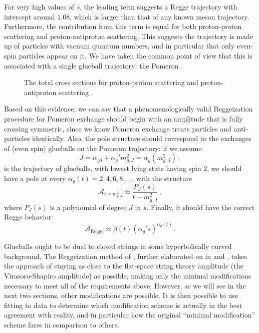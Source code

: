 \documentclass[aps, prd, preprintnumbers, floatfix, showpacs, showkeys, nofootinbib, 10pt]{revtex4-1}
\def\beq{\begin{equation}}
\def\eeq{\end{equation}}
\begin{document}
For very high values of $s$, the leading term suggests a Regge trajectory with intercept around $1.08$, which is larger than that of any known meson trajectory.  Furthermore, the contribution from this term is equal for both proton-proton scattering and proton-antiproton scattering.  This suggests the trajectory is made up of particles with vacuum quantum numbers, and in particular that only even-spin particles appear on it.  We have taken the common point of view that this is associated with a single glueball trajectory: the Pomeron \cite{CGM}.

\begin{figure}
\begin{center}
\caption{\label{totalcross} The total cross sections for proton-proton scattering and proton-antiproton scattering \cite{PDG}.}
\end{center}
\end{figure}

Based on this evidence, we can say that a phenomenologically valid Reggeization procedure for Pomeron exchange should begin with an amplitude that is fully crossing symmetric, since we know Pomeron exchange treats particles and anti-particles identically.  Also, the pole structure should correspond to the exchanges of (even spin) glueballs on the Pomeron trajectory: if we assume
\beq
J = \alpha_{g0} + \alpha_{g}'m_{g, J}^2 = \alpha_g(m_{g, J}^2) \, ,
\eeq
is the trajectory of glueballs, with lowest lying state having spin $2$, we should have a pole at every $\alpha_g(t) = 2, 4, 6, 8, \dots$, with the structure
\beq
\mathcal{A}_{t \approx m_{g, J}^2} \approx \frac{P_{J}(s)}{t - m_{g, J}^2} \, ,
\eeq
where $P_J(s)$ is a polynomial of degree $J$ in $s$.  Finally, it should have the correct Regge behavior:
\beq
\mathcal{A}_{\mathrm{Regge}} \approx \beta(t) \left(\alpha_g's\right)^{\alpha_g(t)} \, .
\eeq

Glueballs ought to be dual to closed strings in some hyperbolically curved background.  The Reggeization method of \cite{DHM}, further elaborated on in \cite{ADHM} and \cite{ADM}, takes the approach of staying as close to the flat-space string theory amplitude (the Virasoro-Shapiro amplitude) as possible, making only the minimal modifications necessary to meet all of the requirements above.  However, as we will see in the next two sections, other modifications are possible.  It is then possible to use fitting to data to determine which modification scheme is actually in the best agreement with reality, and in particular how the original ``minimal modification'' scheme fares in comparison to others.  
\end{document}
